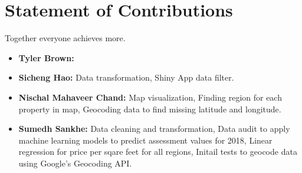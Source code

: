 \documentclass[12pt]{article}
\begin{document}
\section*{Statement of Contributions}

Together everyone achieves more.

\begin{itemize}
\item \textbf{Tyler Brown:} 
\item \textbf{Sicheng Hao:} Data transformation, Shiny App data filter.
\item \textbf{Nischal Mahaveer Chand:} Map visualization, Finding region for each
    property in map, Geocoding data to find missing latitude and longitude.
\item \textbf{Sumedh Sankhe:} Data cleaning and transformation, Data audit to
    apply machine learning models to predict assessment values for 2018,
    Linear regression for price per sqare feet for all regions, Initail tests
    to geocode data using Google's Geocoding API.
\end{itemize}
\end{document}
